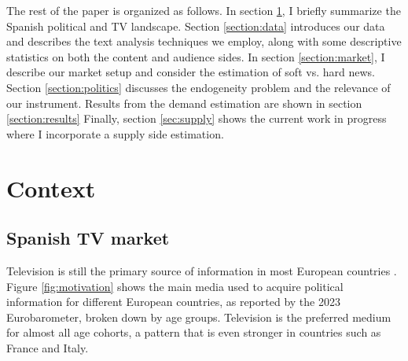 \documentclass[12pt]{article}
\begin{document}
	The rest of the paper is organized as follows. In section \ref{section:context}, I briefly summarize the Spanish political and TV landscape. Section \ref{section:data} introduces our data and describes the text analysis techniques we employ, along with some descriptive statistics on both the content and audience sides. In section \ref{section:market}, I describe our market setup and consider the estimation of soft vs. hard news. Section \ref{section:politics} discusses the endogeneity problem and the relevance of our instrument. Results from the demand estimation are shown in section \ref{section:results} Finally, section \ref{sec:supply} shows the current work in progress where I incorporate a supply side estimation.
	
	
	
	
	
	\section{Context} 
	
	\label{section:context}
	
	
	\subsection{Spanish TV market}
	
	Television is still the primary source of information in most European countries \citep{europarl2024}. Figure \ref{fig:motivation} shows the main media used to acquire political information for different European countries, as reported by the 2023 Eurobarometer, broken down by age groups. Television is the preferred medium for almost all age cohorts, a pattern that is even stronger in countries such as France and Italy.
	
	
	
\end{document}
